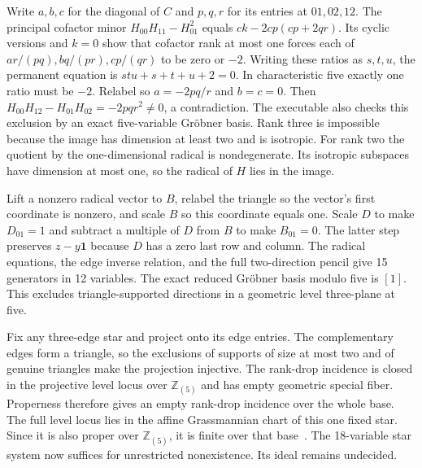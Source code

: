 Write \(a,b,c\) for the diagonal of \(C\) and \(p,q,r\) for its
entries at \(01,02,12\). The principal cofactor minor
\(H_{00}H_{11}-H_{01}^2\) equals
\(ck-2cp(cp+2qr)\). Its cyclic versions and \(k=0\) show
that cofactor rank at most one forces each of
\(ar/(pq), bq/(pr), cp/(qr)\) to be zero or \(-2\).
Writing these ratios as \(s,t,u\), the permanent equation is
\(stu+s+t+u+2=0\). In characteristic five exactly one ratio
must be \(-2\). Relabel so \(a=-2pq/r\) and \(b=c=0\).
Then \(H_{00}H_{12}-H_{01}H_{02}=-2pqr^2\ne0\), a
contradiction. The executable also checks this exclusion by an
exact five-variable Gr\"obner basis. Rank three is impossible
because the image has dimension at least two and is isotropic.
For rank two the quotient by the one-dimensional radical is
nondegenerate. Its isotropic subspaces have dimension at most one,
so the radical of \(H\) lies in the image.

Lift a nonzero radical vector to \(B\), relabel the triangle so
the vector's first coordinate is nonzero, and scale \(B\) so this
coordinate equals one. Scale \(D\) to make \(D_{01}=1\) and subtract
a multiple of \(D\) from \(B\) to make \(B_{01}=0\).
The latter step preserves \(z-y\mathbf1\) because \(D\) has a zero
last row and column. The radical equations, the edge inverse
relation, and the full two-direction pencil give 15 generators in
12 variables. The exact reduced Gr\"obner basis modulo five is
\([1]\). This excludes triangle-supported directions in a
geometric level three-plane at five.

Fix any three-edge star and project onto its edge entries. The
complementary edges form a triangle, so the exclusions of supports
of size at most two and of genuine triangles make the projection
injective. The rank-drop incidence is closed in the projective
level locus over \(\mathbb Z_{(5)}\) and has empty geometric special
fiber. Properness therefore gives an empty rank-drop incidence over
the whole base. The full level locus lies in the affine Grassmannian
chart of this one fixed star. Since it is also proper over
\(\mathbb Z_{(5)}\), it is finite over that base~\cite{stacksproperaffine}.
The 18-variable star system now suffices for unrestricted
nonexistence. Its ideal remains undecided.

